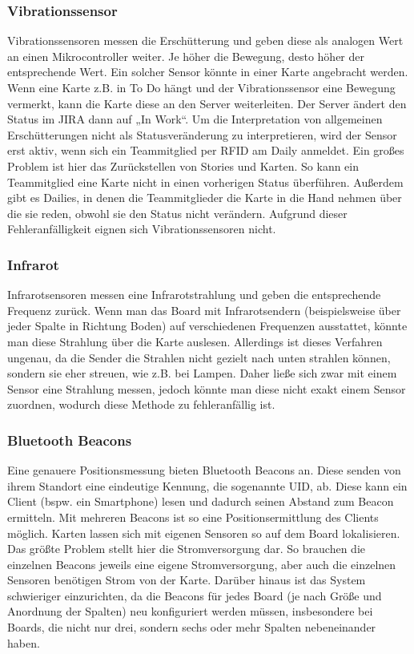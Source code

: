 \documentclass[12pt,titlepage]{scrartcl}
\begin{document}
			\subsubsection{Vibrationssensor}
			Vibrationssensoren messen die Erschütterung und geben diese als analogen Wert an einen Mikrocontroller weiter. Je höher die Bewegung, desto höher der entsprechende Wert. Ein solcher Sensor könnte in einer Karte angebracht werden. Wenn eine Karte z.B. in To Do hängt und der Vibrationssensor eine Bewegung vermerkt, kann die Karte diese an den Server weiterleiten. Der Server ändert den Status im JIRA dann auf „In Work“. Um die Interpretation von allgemeinen Erschütterungen nicht als Statusveränderung zu interpretieren, wird der Sensor erst aktiv, wenn sich ein Teammitglied per RFID am Daily anmeldet. Ein großes Problem ist hier das Zurückstellen von Stories und Karten. So kann ein Teammitglied eine Karte nicht in einen vorherigen Status überführen. Außerdem gibt es Dailies, in denen die Teammitglieder die Karte in die Hand nehmen über die sie reden, obwohl sie den Status nicht verändern. Aufgrund dieser Fehleranfälligkeit eignen sich Vibrationssensoren nicht.
			\subsubsection{Infrarot}
			Infrarotsensoren messen eine Infrarotstrahlung und geben die entsprechende Frequenz zurück. Wenn man das Board mit Infrarotsendern (beispielsweise über jeder Spalte in Richtung Boden) auf verschiedenen Frequenzen ausstattet, könnte man diese Strahlung über die Karte auslesen. Allerdings ist dieses Verfahren ungenau, da die Sender die Strahlen nicht gezielt nach unten strahlen können, sondern sie eher streuen, wie z.B. bei Lampen. Daher ließe sich zwar mit einem Sensor eine Strahlung messen, jedoch könnte man diese nicht exakt einem Sensor zuordnen, wodurch diese Methode zu fehleranfällig ist.
			\subsubsection{Bluetooth Beacons}
			Eine genauere Positionsmessung bieten Bluetooth Beacons an. Diese senden von ihrem Standort eine eindeutige Kennung, die sogenannte UID, ab. Diese kann ein Client (bspw. ein Smartphone) lesen und dadurch seinen Abstand zum Beacon ermitteln. Mit mehreren Beacons ist so eine Positionsermittlung des Clients möglich. Karten lassen sich mit eigenen Sensoren so auf dem Board lokalisieren. Das größte Problem stellt hier die Stromversorgung dar. So brauchen die einzelnen Beacons jeweils eine eigene Stromversorgung, aber auch die einzelnen Sensoren benötigen Strom von der Karte. Darüber hinaus ist das System schwieriger einzurichten, da die Beacons für jedes Board (je nach Größe und Anordnung der Spalten) neu konfiguriert werden müssen, insbesondere bei Boards, die nicht nur drei, sondern sechs oder mehr Spalten nebeneinander haben.
\end{document}
